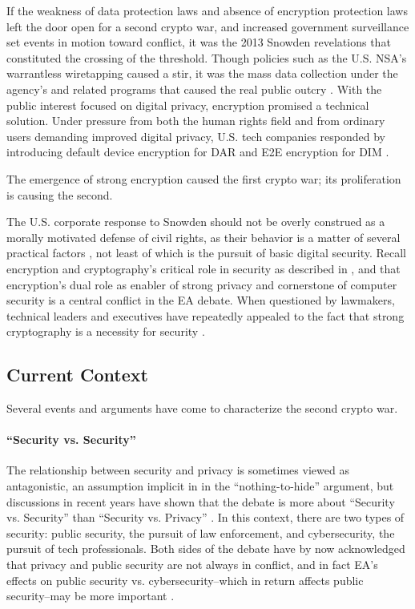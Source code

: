 If the weakness of data protection laws and absence of encryption protection laws left the door open for a second crypto
war, and increased government surveillance set events in motion toward conflict, it was the 2013 Snowden revelations
that constituted the crossing of the threshold. Though policies such as the U.S. \ac{NSA}'s warrantless wiretapping
caused a stir, it was the mass data collection under the agency's  and related programs that caused the real
public outcry \cite{landau_making_2013}. With the public interest focused on digital privacy, encryption promised a
technical solution. Under pressure from both the human rights field and from ordinary users demanding improved digital
privacy, U.S. tech companies responded by introducing default device encryption for \ac{DAR} and \ac{E2E} encryption for
\ac{DIM} \cite{treguer_us_2018}.

The emergence of strong encryption caused the first crypto war; its proliferation is causing the second.

The U.S. corporate response to Snowden should not be overly construed as a morally motivated defense of civil rights, as
their behavior is a matter of several practical factors \cite{treguer_us_2018}, not least of which is the pursuit of
basic digital security. Recall encryption and cryptography's critical role in security as described in
, and that encryption's dual role as enabler of strong privacy and cornerstone of computer
security is a central conflict in the \ac{EA} debate. When questioned by lawmakers, technical leaders and executives
have repeatedly appealed to the fact that strong cryptography is a necessity for security \cite{schulze_clipper_2017}.

\subsection{Current Context}
\label{sec-history-current}

Several events and arguments have come to characterize the second crypto war.

\paragraph*{``Security vs. Security''} The relationship between security and privacy is sometimes viewed as
antagonistic, an assumption implicit in in the ``nothing-to-hide'' argument, but discussions in recent years have shown
that the debate is more about ``Security vs. Security'' than ``Security vs. Privacy''
\cite{stalla_bourdillon_privacy_2014}. In this context, there are two types of security: public security, the pursuit of
law enforcement, and cybersecurity, the pursuit of tech professionals. Both sides of the debate have by now acknowledged
that privacy and public security are not always in conflict, and in fact \ac{EA}'s effects on public security vs.
cybersecurity--which in return affects public security--may be more important \cite{schneier_2019}.

